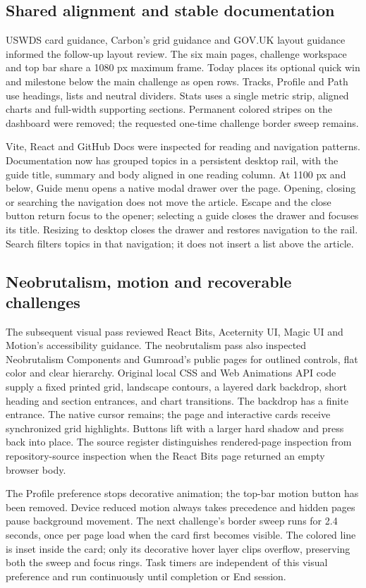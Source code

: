 \subsection{Shared alignment and stable documentation}
USWDS card guidance, Carbon's grid guidance and GOV.UK layout guidance informed
the follow-up layout review. The six main pages, challenge workspace and top bar share a 1080 px maximum
frame. Today places its optional quick win and milestone below the main challenge
as open rows. Tracks, Profile and Path use headings, lists and neutral dividers.
Stats uses a single metric strip, aligned charts and full-width supporting sections.
Permanent colored stripes on the dashboard were removed; the requested one-time
challenge border sweep remains.

Vite, React and GitHub Docs were inspected for reading and navigation patterns.
Documentation now has grouped topics in a persistent desktop rail, with the guide
title, summary and body aligned in one reading column. At 1100 px and below,
Guide menu opens a native modal drawer over the page. Opening, closing or searching
the navigation does not move the article. Escape and the close button return focus
to the opener; selecting a guide closes the drawer and focuses its title. Resizing
to desktop closes the drawer and restores navigation to the rail. Search filters
topics in that navigation; it does not insert a list above the article.

\subsection{Neobrutalism, motion and recoverable challenges}
The subsequent visual pass reviewed React Bits, Aceternity UI, Magic UI and Motion's
accessibility guidance. The neobrutalism pass also inspected Neobrutalism Components
and Gumroad's public pages for outlined controls, flat color and clear hierarchy.
Original local CSS and Web Animations API code supply a fixed printed grid,
landscape contours, a layered dark backdrop, short heading and section entrances,
and chart transitions. The backdrop has a finite entrance. The native cursor
remains; the page and interactive cards receive synchronized grid highlights. Buttons lift
with a larger hard shadow and press back into place.
The source register distinguishes rendered-page inspection from repository-source
inspection when the React Bits page returned an empty browser body.

The Profile preference stops decorative animation; the top-bar motion button has
been removed. Device
reduced motion always takes precedence and hidden pages pause background movement.
The next challenge's border sweep runs for 2.4 seconds, once per page load when the
card first becomes visible. The colored line is inset inside the card; only its
decorative hover layer clips overflow, preserving both the sweep and focus rings.
Task timers are independent
of this visual preference and run continuously until completion or End session.

